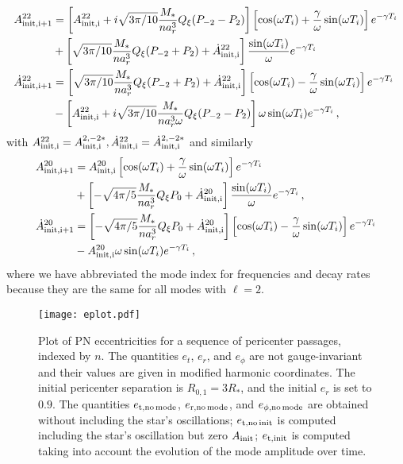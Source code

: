 \documentclass[prd,aps,floatfix,superscriptaddress,nofootinbib,twocolumn,10pt,English]{revtex4}
\begin{document}
\begin{widetext}
\begin{align}\label{eqa2map}
A^{22}_{\rm init, i+1} & = \left [A^{22}_{\rm init,i} +i \sqrt{3 \pi/10} \frac{M_*}{n a^3_r}Q_\xi (P_{-2}-P_2) \right]\left [ \cos (\omega T_i) +\frac{\gamma}{\omega} \sin (\omega T_i)\right ] e^{- \gamma T_i}\nonumber \\
&+ \left [\sqrt{3 \pi/10} \frac{M_*}{n a^3_r}Q_\xi (P_{-2}+P_2)+\dot{A}^{22}_{\rm init,i } \right ] \frac{ \sin (\omega T_i)}{\omega} e^{- \gamma T_i}\nonumber \\
\dot{A}^{22}_{\rm init, i+1} & =\left [\sqrt{3 \pi/10} \frac{M_*}{n a^3_r}Q_\xi (P_{-2}+P_2)+\dot{A}^{22}_{\rm init,i } \right ]  \left [ \cos (\omega T_i) -\frac{\gamma}{\omega}\sin (\omega T_i)\right ] e^{- \gamma T_i}\nonumber \\
&-\left [A^{22}_{\rm init,i} +i \sqrt{3 \pi/10} \frac{M_*}{n a^3_r\omega}Q_\xi (P_{-2}-P_2) \right] \omega  \sin (\omega T_i)  e^{- \gamma T_i}\,,
\end{align}
with $A^{22}_{\rm init, i} =A^{2,-2 *}_{\rm init, i}, \dot{A}^{22}_{\rm init, i} =\dot{A}^{2,-2 *}_{\rm init, i}$ and similarly
\begin{align}\label{eqa0map}
A^{20}_{\rm init, i+1} & = A^{20}_{\rm init,i} \left [ \cos (\omega T_i) +\frac{\gamma}{\omega} \sin (\omega T_i)\right ] e^{- \gamma T_i}\nonumber \\
&+ \left [-\sqrt{4 \pi/5} \frac{M_*}{n a^3_r}Q_\xi P_0+\dot{A}^{20}_{\rm init,i } \right ] \frac{ \sin (\omega T_i)}{\omega} e^{- \gamma T_i}\,,\nonumber \\
\dot{A}^{20}_{\rm init, i+1} & =\left [-\sqrt{4 \pi/5} \frac{M_*}{n a^3_r}Q_\xi P_0+\dot{A}^{20}_{\rm init,i } \right ]  \left [ \cos (\omega T_i) -\frac{\gamma}{\omega}\sin (\omega T_i)\right ] e^{- \gamma T_i}\nonumber \\
&-A^{20}_{\rm init,i}\omega  \sin (\omega T_i)  e^{- \gamma T_i}\,,
\end{align}
where we have abbreviated the mode index for frequencies and decay rates because they are the same for all modes with $\ell=2$. 

\end{widetext}

\begin{figure}[tb]
\texttt{[image: eplot.pdf]}
\caption{Plot of PN eccentricities for a sequence of pericenter passages,
indexed by $n$. The quantities $e_t$, $e_r$, and $e_\phi$ are not gauge-invariant and
their values  are given in modified harmonic coordinates. The initial pericenter
separation is $R_{0,1}=3 R_*$, and the initial $e_r$ is set to $0.9$. The quantities $e_{\rm
t, no \,mode}$, $e_{\rm r, no\, mode}$, and $e_{\rm \phi, no \, mode}$ are
obtained without including the star's oscillations; $e_{\rm t, no \, init}$ is
computed including the star's oscillation but zero $A_{\rm init}$; $e_{\rm t,
init}$ is computed taking into account the evolution of the mode amplitude over
time.}
\label{fig:eplot}
\end{figure}
\end{document}
